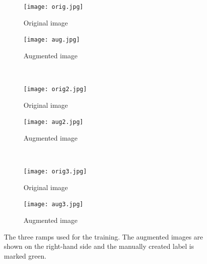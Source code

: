 \begin{figure}[htb]
	\centering
	\begin{subfigure}{.47\linewidth}
		\centering
		\texttt{[image: orig.jpg]}
		\caption{Original image}
	\end{subfigure}
	\begin{subfigure}{.47\linewidth}
		\centering
		\texttt{[image: aug.jpg]}
		\caption{Augmented image}
	\end{subfigure}
	\\
	\begin{subfigure}{.47\linewidth}
		\centering
		\texttt{[image: orig2.jpg]}
		\caption{Original image}
	\end{subfigure}
	\begin{subfigure}{.47\linewidth}
		\centering
		\texttt{[image: aug2.jpg]}
		\caption{Augmented image}
	\end{subfigure}
	\\
	\begin{subfigure}{.47\linewidth}
		\centering
		\texttt{[image: orig3.jpg]}
		\caption{Original image}
	\end{subfigure}
	\begin{subfigure}{.47\linewidth}
		\centering
		\texttt{[image: aug3.jpg]}
		\caption{Augmented image}
	\end{subfigure}
	\caption[Examples of augmented images]{The three ramps used for the training. The augmented images are shown on the right-hand side and the manually created label is marked green.}
	\label{fig:img_augmentated}
\end{figure}


